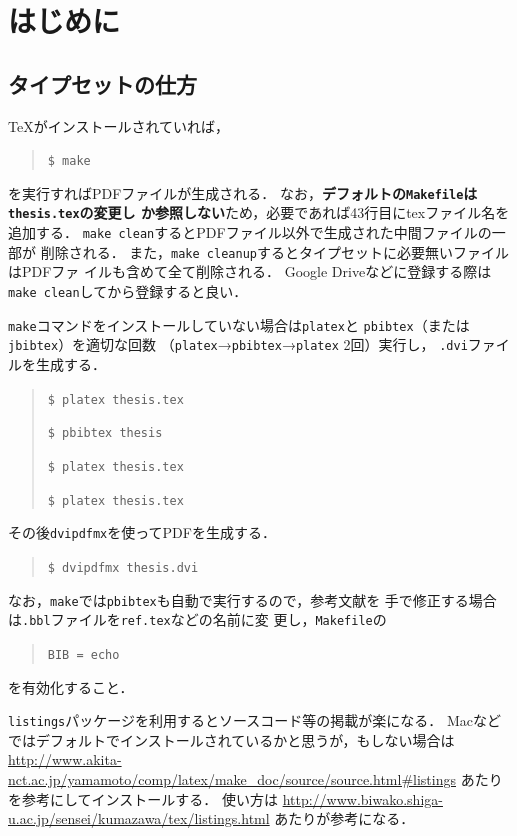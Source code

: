 
\chapter{はじめに}
\label{cha:intro}

\section{タイプセットの仕方}

TeXがインストールされていれば，
\begin{quote}
 \texttt{\$ make}
\end{quote}
を実行すればPDFファイルが生成される．
なお，\textbf{デフォルトの\texttt{Makefile}は\texttt{thesis.tex}の変更し
か参照しない}ため，必要であれば43行目にtexファイル名を追加する．
\texttt{make clean}するとPDFファイル以外で生成された中間ファイルの一部が
削除される．
また，\texttt{make cleanup}するとタイプセットに必要無いファイルはPDFファ
イルも含めて全て削除される．
Google Driveなどに登録する際は\texttt{make clean}してから登録すると良い．

\texttt{make}コマンドをインストールしていない場合は\texttt{platex}と
\texttt{pbibtex}（または\texttt{jbibtex}）を適切な回数
（\texttt{platex}→\texttt{pbibtex}→\texttt{platex} 2回）実行し，
\texttt{.dvi}ファイルを生成する．
\begin{quote}
 \texttt{\$ platex thesis.tex}

 \texttt{\$ pbibtex thesis}

 \texttt{\$ platex thesis.tex}

 \texttt{\$ platex thesis.tex}
\end{quote}

その後\texttt{dvipdfmx}を使ってPDFを生成する．
\begin{quote}
 \texttt{\$ dvipdfmx thesis.dvi}
\end{quote}

なお，\texttt{make}では\texttt{pbibtex}も自動で実行するので，参考文献を
手で修正する場合は\texttt{.bbl}ファイルを\texttt{ref.tex}などの名前に変
更し，\texttt{Makefile}の
\begin{quote}
 \texttt{BIB = echo}
\end{quote}
を有効化すること．

\texttt{listings}パッケージを利用するとソースコード等の掲載が楽になる．
Macなどではデフォルトでインストールされているかと思うが，もしない場合は
\url{http://www.akita-nct.ac.jp/yamamoto/comp/latex/make_doc/source/source.html#listings}
あたりを参考にしてインストールする．
使い方は
\url{http://www.biwako.shiga-u.ac.jp/sensei/kumazawa/tex/listings.html}
あたりが参考になる．

